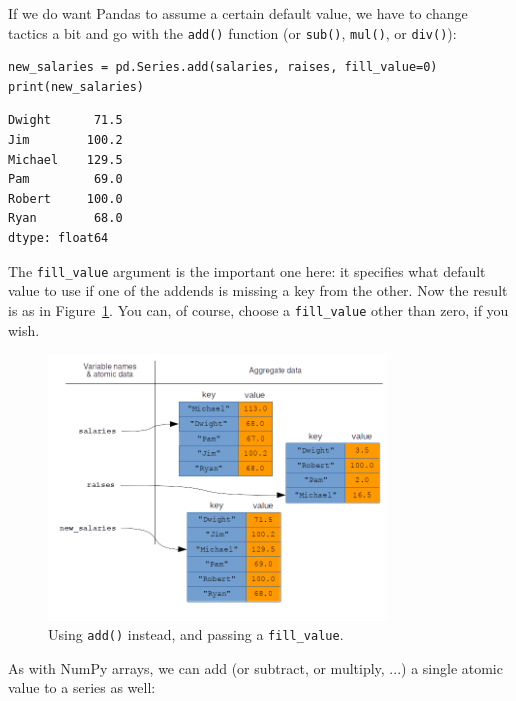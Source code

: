 
If we do want Pandas to assume a certain default value, we have to change
tactics a bit and go with the \texttt{add()} function (or \texttt{sub()},
\texttt{mul()}, or \texttt{div()}):

\begin{Verbatim}[fontsize=\footnotesize,samepage=true,frame=single,framesep=3mm]
new_salaries = pd.Series.add(salaries, raises, fill_value=0)
print(new_salaries)
\end{Verbatim}

\begin{Verbatim}[fontsize=\small,samepage=true,frame=leftline,framesep=5mm,framerule=1mm]
Dwight      71.5
Jim        100.2
Michael    129.5
Pam         69.0
Robert     100.0
Ryan        68.0
dtype: float64
\end{Verbatim}

The \texttt{fill\_value} argument is the important one here: it specifies what
default value to use if one of the addends is missing a key from the other. Now
the result is as in Figure~\ref{fig:vectorizedPandas3}. You can, of course,
choose a \texttt{fill\_value} other than zero, if you wish.

\begin{figure}[ht]
\centering
\includegraphics[width=0.8\textwidth]{vectorizedPandas3.png}
\caption{Using \texttt{add()} instead, and passing a \texttt{fill\_value}.}
\label{fig:vectorizedPandas3}
\end{figure}

As with NumPy arrays, we can add (or subtract, or multiply, ...) a single
atomic value to a series as well:

